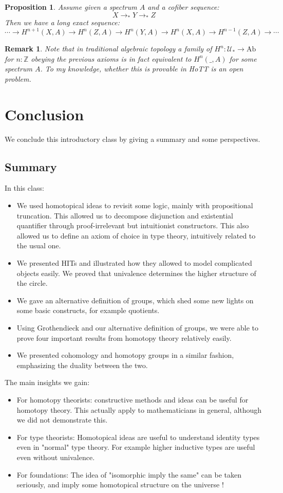 \documentclass{article}
\newcommand{\se}[1]{\medbreak \medbreak \section{#1}}
\newcommand{\sse}[1]{\medbreak \subsection{#1}}
\newcommand{\U}{{\mathcal U}}
\renewcommand{\r}{\rightarrow}
\newtheorem{proposition}{Proposition}
\newtheorem{remark}{Remark}
\begin{document}
\begin{proposition}
Assume given a spectrum $A$ and a cofiber sequence: 
\[X\r_* Y\r_* Z\]
Then we have a long exact sequence:
\[\cdots \r H^{n+1}(X,A) \r H^n(Z,A) \r H^n(Y,A) \r H^n(X,A) \r H^{n-1}(Z,A) \r \cdots \]
\end{proposition}


\begin{remark}
Note that in traditional algebraic topology a family of $H^n : \U_* \r \mathrm{Ab}$ for $n:\mathbb{Z}$ obeying the previous axioms is in fact equivalent to $H^n(\_,A)$ for some spectrum $A$. To my knowledge, whether this is provable in HoTT is an open problem. %
\end{remark}



\se{Conclusion}

We conclude this introductory class by giving a summary and some perspectives. 

\sse{Summary}
In this class:
\begin{itemize}
\item We used homotopical ideas to revisit some logic, mainly with propositional truncation. This allowed us to decompose disjunction and existential quantifier through proof-irrelevant but intuitionist constructors. This also allowed us to define an axiom of choice in type theory, intuitively related to the usual one.
\item We presented HITs and illustrated how they allowed to model complicated objects easily. We proved that univalence determines the higher structure of the circle.
\item We gave an alternative definition of groups, which shed some new lights on some basic constructs, for example quotients.
\item Using Grothendieck and our alternative definition of groups, we were able to prove four important results from homotopy theory relatively easily. %
\item We presented cohomology and homotopy groups in a similar fashion, emphasizing the duality between the two.
\end{itemize}

\noindent The main insights we gain:
\begin{itemize}
\item For homotopy theorists: constructive methods and ideas can be useful for homotopy theory. This actually apply to mathematicians in general, although we did not demonstrate this.
\item For type theorists: Homotopical ideas are useful to understand identity types even in "normal" type theory. For example higher inductive types are useful even without univalence. 
\item For foundations: The idea of "isomorphic imply the same" can be taken seriously, and imply some homotopical structure on the universe !
\end{itemize}
\end{document}
